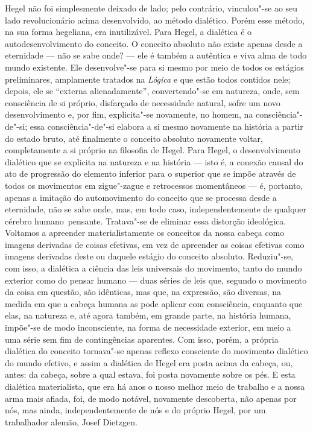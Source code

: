 Hegel não
foi simplesmente deixado de lado; pelo contrário, vinculou"-se ao seu
lado revolucionário acima desenvolvido, ao método dialético. Porém esse
método, na sua forma hegeliana, era inutilizável.
Para Hegel,
a dialética é o autodesenvolvimento do conceito. O conceito absoluto não
existe apenas desde a eternidade --- não se sabe onde? --- ele é também a
autêntica e viva alma de todo mundo existente. Ele desenvolve"-se para si
mesmo por meio de todos os estágios preliminares, amplamente tratados na
\emph{Lógica} e que estão todos contidos nele; depois, ele se ``externa
alienadamente'', convertendo"-se em natureza, onde, sem consciência de si
próprio, disfarçado de necessidade natural, sofre um novo
desenvolvimento e, por fim, explicita"-se novamente, no homem, na
consciência"-de"-si; essa consciência"-de"-si elabora a si mesmo 
novamente na história a partir do estado bruto, até
finalmente o conceito absoluto novamente voltar, completamente a si
próprio na filosofia
de Hegel.
Para Hegel,
o desenvolvimento dialético que se explicita na natureza e na história ---
isto é, a conexão causal do ato de progressão do elemento inferior para
o superior que se impõe através de todos os movimentos em zigue"-zague e
retrocessos momentâneos --- é, portanto, apenas a imitação 
do automovimento do conceito que se processa desde a
eternidade, não se sabe onde, mas, em todo caso, independentemente de
qualquer cérebro humano\est\ pensante. Tratava"-se de eliminar essa distorção
ideológica. Voltamos a apreender materialistamente os conceitos da nossa
cabeça como imagens derivadas de coisas efetivas, em 
vez de apreender as coisas efetivas como imagens derivadas
deste ou daquele estágio do conceito absoluto. 
Reduziu"-se, com isso, a dialética a ciência das leis universais do
movimento, tanto do mundo exterior como do pensar humano --- duas séries
de leis que, segundo o movimento da coisa em questão, são
idênticas, mas que, na expressão, são diversas, na medida em que a
cabeça humana as pode aplicar com consciência, enquanto que elas, na
natureza e, até agora também, em grande parte, na história humana,
impõe"-se de modo inconsciente, na forma de necessidade exterior, em meio
a uma série sem fim de contingências aparentes. Com isso, porém, a
própria dialética do conceito tornava"-se apenas reflexo consciente do
movimento dialético do mundo efetivo, e assim a dialética
de Hegel era
posta acima da cabeça, ou, antes: da 
cabeça, sobre a qual estava, foi posta novamente sobre os pés. E esta
dialética materialista, que era há anos o nosso melhor meio de trabalho
e a nossa arma mais afiada, foi, de modo notável, novamente descoberta,
não apenas por nós, mas ainda, independentemente de nós e do próprio
Hegel,
por um trabalhador
alemão, Josef Dietzgen.

